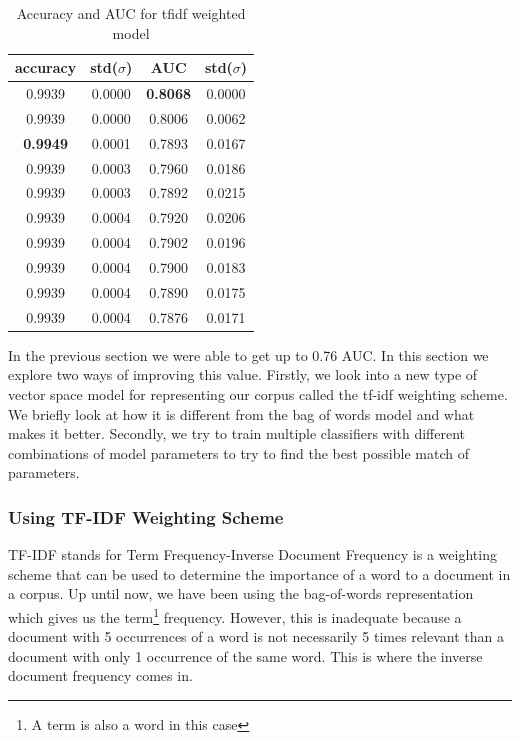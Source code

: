 \begin{table}
  \centering
  \begin{tabular}{cccc} \toprule
    accuracy        & std($\sigma$) & AUC             & std($\sigma$) \\ \midrule
    0.9939          & 0.0000        & \textbf{0.8068} & 0.0000 \\
    0.9939          & 0.0000        & 0.8006          & 0.0062 \\
    \textbf{0.9949} & 0.0001        & 0.7893          & 0.0167 \\
    0.9939          & 0.0003        & 0.7960          & 0.0186 \\
    0.9939          & 0.0003        & 0.7892          & 0.0215 \\ \midrule
    0.9939          & 0.0004        & 0.7920          & 0.0206 \\
    0.9939          & 0.0004        & 0.7902          & 0.0196 \\
    0.9939          & 0.0004        & 0.7900          & 0.0183 \\
    0.9939          & 0.0004        & 0.7890          & 0.0175 \\
    0.9939          & 0.0004        & 0.7876          & 0.0171 \\ \bottomrule
  \end{tabular}
    \caption{Accuracy and AUC for tfidf weighted model}
    \label{tab:tfidf-model-table}
\end{table}

In the previous section we were able to get up to 0.76 AUC\@. In this section we explore two ways of
improving this value. Firstly, we look into a new type of vector space model for representing our
corpus called the tf-idf weighting scheme. We briefly look at how it is different from the bag of
words model and what makes it better. Secondly, we try to train multiple classifiers with
different combinations of model parameters to try to find the best possible match of parameters.


\subsubsection{Using TF-IDF Weighting Scheme}
TF-IDF stands for Term Frequency-Inverse Document Frequency is a weighting scheme that can be used
to determine the importance of a word to a document in a corpus. Up until now, we have been using
the bag-of-words representation which gives us the term\footnote{A term is also a word in this case}
frequency. However, this is inadequate because a document with 5 occurrences of a word is not
necessarily 5 times relevant than a document with only 1 occurrence of the same word. This is where
the inverse document frequency comes in.

